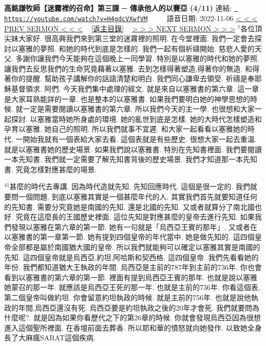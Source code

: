 \documentclass{book}
\begin{document}
\section{}
\label{sec:H4gdcVXwfVM}
\textbf{高銘謙牧師【迷霧裡的召命】第三課 ─ 傳承他人的以賽亞 (4/11)}
\newline
\newline
連結: \href{https://youtube.com/watch?v=H4gdcVXwfVM}{\texttt{ https://youtube.com/watch?v=H4gdcVXwfVM}} ~~~~ 語音日期: 2022-11-06 
\newline
\newline
\hyperref[sec:liEtjDNazis]{\small{< < < PREV SERMON < < <}}
~
\hyperref[sec:index]{\small{[返主目錄]}}
~
\hyperref[sec:djNxJ0pc_CU]{\small{> > > NEXT SERMON > > >}}
\newline
\newline
$^{1}$各位頂尖妹大家好.
很高興我們來到第三堂的迷霧裡的照明.
在今堂裡面.
我們一定會去探討以塞雅的夢照.
和她的時代到底是怎樣的.
我們一起有個祈禱開始.
慈悲人愛的天父.
多謝你讓我們今天能夠在這個晚上一同學習.
特別是以塞雅的時代和她的夢照.
讓我們去反思我們的生命究竟藉著以塞雅.
去到怎樣得著塑造,得著你的無造.
和得著你的提醒.
幫助孩子講解你的話語清楚和明白.
我們同心謙卑去領受.
祈禱是奉耶穌基督領求.
阿們.
今天我們集中處理的經文.
就是來自以塞雅書的第六章.
這一章是大家耳熟能詳的一章.
也是整本的以塞雅書.
如果我們要明白她的神學思想的時候.
就一定是需要閱讀以塞雅書的第六章.
所以我們今天的主一學.
也很想和大家一起探討.
以塞雅當時她所身處的環境.
她的亂世到底是怎樣.
她的大時代怎樣塑造和孕育以塞雅.
她自己的照明.
所以我們就事不宜遲.
和大家一起看看以塞雅她的時代.
一開始我就有一個表給大家去看.
這個表就是有些歷史.
很想大家一起去重溫.
就是以塞雅書她的歷史場景.
如果我們說以塞雅書.
特別在先知書裡面.
我們要閱讀一本先知書.
我們就一定需要了解先知書背後的歷史場景.
我們才知道那一本先知書.
究竟怎樣對應甚麼的場景.

$^{41}$甚麼的時代去專講.
因為時代造就先知.
先知回應時代.
這個是很一定的.
我們就要問一個問題.
到底以塞雅其實是一個甚麼年代的人.
其實我們首先就要知道任何的先知書.
需要分究竟她是南國的先知.
還是北國的先知.
又或者就算分了南北國也好.
究竟在這麼長的王國歷史裡面.
這位先知是對應甚麼的皇帝去進行先知.
如果我們發現以塞雅在第六章的第一節.
她有一句就是「烏西亞王賓的那年」.
又或者在以塞雅書的第一章第一節.
她有提到四個皇帝的年代當中.
她是做先知的.
這四個皇帝全部都是屬於南國猶大國的皇帝.
所以我們就能夠可以確定以塞雅其實是南國的先知.
這四個皇帝就是烏西亞,約坦,阿哈斯和契西格.
這四個皇帝.
我們先看看她的年份.
我們都知道猶大王執政的年間.
烏西亞是主前的787年到主前的736年.
你也會看到以塞雅書的第六章的第一節.
裡面有提到烏西亞王賓的那年.
也就是說以塞雅她蒙召的那一年.
就應該是烏西亞王死的那一年.
也就是主前的736年.
你看這個表,第二個皇帝叫做約坦.
你會留意約坦執政的時候.
就是主前的756年.
也就是說他執政的年間,烏西亞還沒有死.
烏西亞要是約坦執政之後的20年才會死.
我們就要問為什麼呢?.
就是因為如果你看歷代之下的第26章的時候.
你就會發現烏西亞因為很想進入這個聖所裡面.
在香壇前面去葬香.
所以耶和華的憤怒就向她發作.
以致她全身長了大麻瘋SARAT這個疾病.
\end{document}
